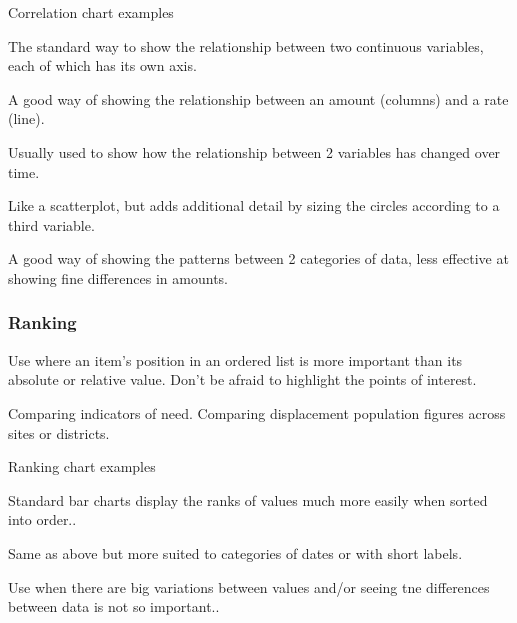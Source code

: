 \documentclass[letterpaper,10pt,english]{jupyterBook}
\begin{document}
\sphinxAtStartPar
Correlation chart examples

\sphinxAtStartPar
{} The standard way to show the relationship between two continuous variables, each of which has its own axis.

\sphinxAtStartPar
{} A good way of showing the relationship between an amount (columns) and a rate (line).

\sphinxAtStartPar
{} Usually used to show how the relationship between 2 variables has changed over time.

\sphinxAtStartPar
{} Like a scatterplot, but adds additional detail by sizing the circles according to a third variable.

\sphinxAtStartPar
{} A good way of showing the patterns between 2 categories of data, less effective at showing fine differences in amounts.


\subsubsection{Ranking}
\label{\detokenize{part1/communication:ranking}}
\sphinxAtStartPar
Use where an item’s position in an ordered list is more important than its absolute or relative value. Don’t be afraid to highlight the points of interest.

\sphinxAtStartPar
{} Comparing indicators of need. Comparing displacement population figures across sites or districts.

\sphinxAtStartPar
Ranking chart examples

\sphinxAtStartPar
{} Standard bar charts display the ranks of values much more easily when sorted into order..

\sphinxAtStartPar
{} Same as above but more suited to categories of dates or with short labels.

\sphinxAtStartPar
{} Use when there are big variations between values and/or seeing tne differences
between data is not so important..
\end{document}
